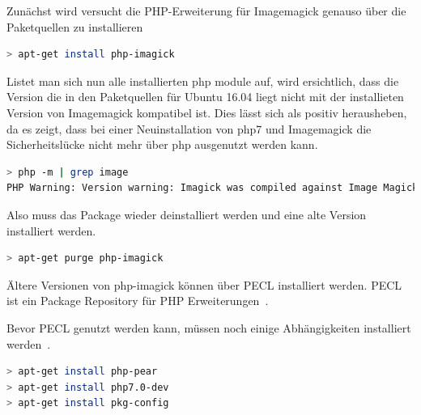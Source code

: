 
Zunächst wird versucht die PHP-Erweiterung für Imagemagick genauso über die Paketquellen zu installieren

\begin{lstlisting}[language=Bash, caption=Install PHP-Imagick Modul,label={lst:installphpmagick}]
> apt-get install php-imagick
\end{lstlisting}
\vspace{5mm}

Listet man sich nun alle installierten php module auf, wird ersichtlich, dass die Version die in den Paketquellen für Ubuntu 16.04 liegt nicht mit der installieten Version von Imagemagick kompatibel ist.
Dies lässt sich als positiv herausheben, da es zeigt, dass bei einer Neuinstallation von php7 und Imagemagick die Sicherheitslücke nicht mehr über php ausgenutzt werden kann.

\begin{lstlisting}[language=Bash, caption=PHP Module überprüfen,label={lst:checkmodule}]
> php -m | grep image
PHP Warning: Version warning: Imagick was compiled against Image Magick version 1673 but version 1682 is loaded. Imagick will run but may behave surprisingly in Unknown on line 0
\end{lstlisting}
\vspace{5mm}

Also muss das Package wieder deinstalliert werden und eine alte Version installiert werden.

\begin{lstlisting}[language=Bash, caption=Uninstall PHP-Imagick Modul,label={lst:uninstallimagick}]
> apt-get purge php-imagick
\end{lstlisting}
\vspace{5mm}

\newpage
{}

Ältere Versionen von php-imagick können über PECL installiert werden.
PECL ist ein Package Repository für PHP Erweiterungen~\cite{PHPPecl}.

Bevor PECL genutzt werden kann, müssen noch einige Abhängigkeiten installiert werden~\cite{InstallPECLExtensions}.
\begin{lstlisting}[language=Bash, caption=Installiere PECL Abhängigkeiten,label={lst:installpecldeps}]
> apt-get install php-pear
> apt-get install php7.0-dev
> apt-get install pkg-config
\end{lstlisting}
\vspace{5mm}

